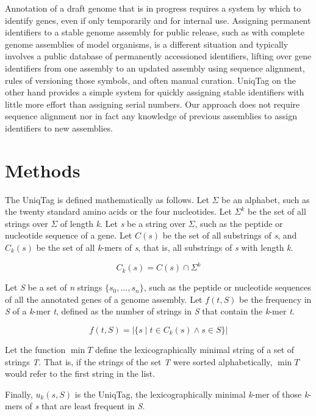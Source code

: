 \documentclass[
  12pt,
  oneside,
  openany]{book}
\begin{document}
Annotation of a draft genome that is in progress requires a system by which to identify genes, even if only temporarily and for internal use. Assigning permanent identifiers to a stable genome assembly for public release, such as with complete genome assemblies of model organisms, is a different situation and typically involves a public database of permanently accessioned identifiers, lifting over gene identifiers from one assembly to an updated assembly using sequence alignment, rules of versioning those symbols, and often manual curation. UniqTag on the other hand provides a simple system for quickly assigning stable identifiers with little more effort than assigning serial numbers. Our approach does not require sequence alignment nor in fact any knowledge of previous assemblies to assign identifiers to new assemblies.

\hypertarget{methods-2}{%
\section{Methods}\label{methods-2}}

The UniqTag is defined mathematically as follows. Let \(\Sigma\) be an alphabet, such as the twenty standard amino acids or the four nucleotides. Let \(\Sigma^k\) be the set of all strings over \(\Sigma\) of length \emph{k}. Let \emph{s} be a string over \(\Sigma\), such as the peptide or nucleotide sequence of a gene. Let \(C(s)\) be the set of all substrings of \emph{s}, and \(C_k(s)\) be the set of all \emph{k}-mers of \emph{s}, that is, all substrings of \emph{s} with length \emph{k}.

\[
C_k(s) = C(s) \cap \Sigma^k
\]

Let \emph{S} be a set of \emph{n} strings \(\{s_0, \dots, s_n\}\), such as the peptide or nucleotide sequences of all the annotated genes of a genome assembly. Let \(f(t, S)\) be the frequency in \emph{S} of a \emph{k}-mer \emph{t}, defined as the number of strings in \emph{S} that contain the \emph{k}-mer \emph{t}.

\[
f(t, S) = \left\vert \{ s \mid t \in C_k(s) \wedge s \in S \} \right\vert
\]

Let the function \(\min T\) define the lexicographically minimal string of a set of strings \emph{T}. That is, if the strings of the set \emph{T} were sorted alphabetically, \(\min T\) would refer to the first string in the list.

Finally, \(u_k(s, S)\) is the UniqTag, the lexicographically minimal \emph{k}-mer of those \emph{k}-mers of \emph{s} that are least frequent in \emph{S}.
\end{document}
